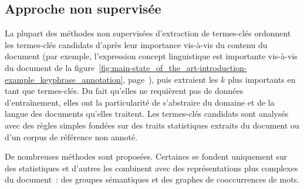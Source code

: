     \subsection{Approche non supervisée}
    \label{subsec:main-state_of_the_art-automatic_keyphrase_extraction-unsupervised_keyphrase_extraction}
      La plupart des méthodes non supervisées d'extraction de termes-clés
      ordonnent les termes-clés candidats d'après leur importance vis-à-vis du
      contenu du document (par exemple, l'expression \og{}concept
      linguistique\fg{} est importante vis-à-vis du document de la
      figure~\ref{fig:main-state_of_the_art-introduction-example_keyphrase_annotation},
      page~\pageref{fig:main-state_of_the_art-introduction-example_keyphrase_annotation}),
      puis extraient les $k$ plus importants en tant que termes-clés. Du fait
      qu'elles ne requièrent pas de données d'entraînement, elles ont la
      particularité de s'abstraire du domaine et de la langue des documents
      qu'elles traitent. Les termes-clés candidats sont analysés avec des règles
      simples fondées sur des traits statistiques extraits du document ou d'un
      corpus de référence non annoté.

      De nombreuses méthodes sont proposées. Certaines se fondent uniquement
      sur des statistiques et d'autres les combinent avec des représentations
      plus complexes du document~: des groupes sémantiques et des
      graphes de cooccurrences de mots.

